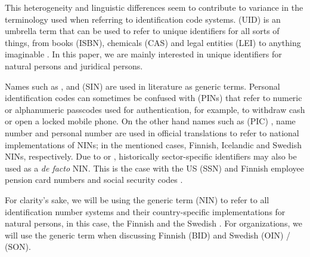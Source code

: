 This heterogeneity and linguistic differences seem to contribute to variance in the terminology used when referring to identification code systems.  (UID) is an umbrella term that can be used to refer to unique identifiers for all sorts of things, from books (ISBN), chemicals (CAS) and legal entities (LEI) to anything imaginable \citep[see][]{dodge2005}. In this paper, we are mainly interested in unique identifiers for natural persons and juridical persons. 

Names such as  \citep{dodge2005},  \citep{alastalo2022} and  (SIN) \citep{otjacques2007} are used in literature as generic terms. Personal identification codes can sometimes be confused with  (PINs) that refer to numeric or alphanumeric passcodes used for authentication, for example, to withdraw cash or open a locked mobile phone. On the other hand names such as  (PIC) \citep{hetudvv, sund2012}, name number \citep{watson2010} and personal number \citep{scb2016} are used in official translations to refer to national implementations of NINs; in the mentioned cases, Finnish, Icelandic and Swedish NINs, respectively. Due to  \citep[see][]{brensinger2021, alastalo2022} or  \citep[see][]{dodge2005}, historically sector-specific identifiers may also be used as a \emph{de facto} NIN. This is the case with the US  (SSN) \citep{brensinger2021} and Finnish employee pension card numbers and social security codes \citep{alastalo2022}.

For clarity's sake, we will be using the generic term  (NIN) to refer to all identification number systems and their country-specific implementations for natural persons, in this case, the Finnish  and the Swedish . For organizations, we will use the generic term  when discussing Finnish  (BID) and Swedish  (OIN) /  (SON).

